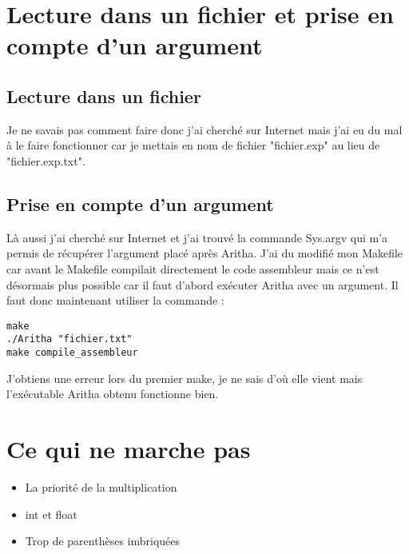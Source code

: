 \documentclass{article}
\begin{document}
\section{Lecture dans un fichier et prise en compte d'un argument}

\subsection{Lecture dans un fichier}
Je ne savais pas comment faire donc j'ai cherché sur Internet mais j'ai eu du mal à le faire fonctionner car je mettais en nom de fichier "fichier.exp" au lieu de "fichier.exp.txt".

\subsection{Prise en compte d'un argument}
Là aussi j'ai cherché sur Internet et j'ai trouvé la commande Sys.argv qui m'a permis de récupérer l'argument placé après Aritha. J'ai du modifié mon Makefile car avant le Makefile compilait directement le code assembleur mais ce n'est désormais plus possible car il faut d'abord exécuter Aritha avec un argument. Il faut donc maintenant utiliser la commande :
\begin{lstlisting}
make
./Aritha "fichier.txt"
make compile_assembleur
\end{lstlisting}
J'obtiens une erreur lors du premier make, je ne sais d'où elle vient mais l'exécutable Aritha obtenu fonctionne bien.

\section{Ce qui ne marche pas}
\begin{itemize}
\item La priorité de la multiplication
\item int et float
\item Trop de parenthèses imbriquées
\end{itemize}
\end{document}
